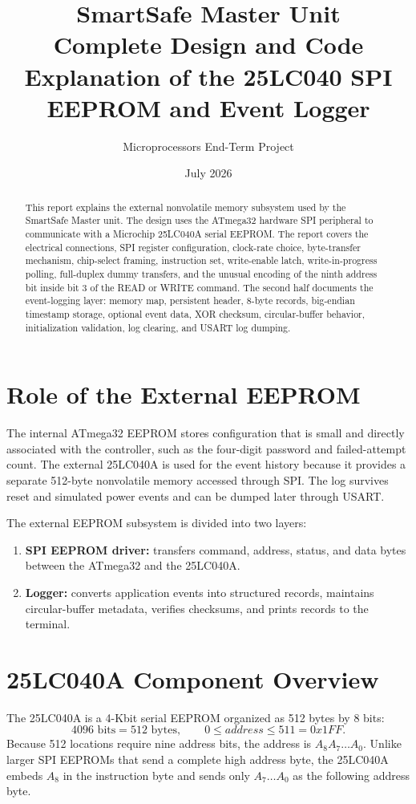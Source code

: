 \documentclass[11pt,a4paper]{article}
\title{\textbf{SmartSafe Master Unit}\\[4pt]
\Large Complete Design and Code Explanation of the 25LC040 SPI EEPROM and Event Logger}
\author{Microprocessors End-Term Project}
\date{July 2026}
\begin{document}
\maketitle
\thispagestyle{empty}

\begin{abstract}
This report explains the external nonvolatile memory subsystem used by the SmartSafe Master unit. The design uses the ATmega32 hardware SPI peripheral to communicate with a Microchip 25LC040A serial EEPROM. The report covers the electrical connections, SPI register configuration, clock-rate choice, byte-transfer mechanism, chip-select framing, instruction set, write-enable latch, write-in-progress polling, full-duplex dummy transfers, and the unusual encoding of the ninth address bit inside bit 3 of the READ or WRITE command. The second half documents the event-logging layer: memory map, persistent header, 8-byte records, big-endian timestamp storage, optional event data, XOR checksum, circular-buffer behavior, initialization validation, log clearing, and USART log dumping.
\end{abstract}

\tableofcontents
\newpage

\section{Role of the External EEPROM}
The internal ATmega32 EEPROM stores configuration that is small and directly associated with the controller, such as the four-digit password and failed-attempt count. The external 25LC040A is used for the event history because it provides a separate 512-byte nonvolatile memory accessed through SPI. The log survives reset and simulated power events and can be dumped later through USART.

The external EEPROM subsystem is divided into two layers:
\begin{enumerate}[label=\arabic*.]
  \item \textbf{SPI EEPROM driver:} transfers command, address, status, and data bytes between the ATmega32 and the 25LC040A.
  \item \textbf{Logger:} converts application events into structured records, maintains circular-buffer metadata, verifies checksums, and prints records to the terminal.
\end{enumerate}

\section{25LC040A Component Overview}
The 25LC040A is a 4-Kbit serial EEPROM organized as 512 bytes by 8 bits:
\[
4096\text{ bits}=512\text{ bytes},\qquad 0\leq address\leq511=0x1FF.
\]
Because 512 locations require nine address bits, the address is $A_8A_7\ldots A_0$. Unlike larger SPI EEPROMs that send a complete high address byte, the 25LC040A embeds $A_8$ in the instruction byte and sends only $A_7\ldots A_0$ as the following address byte.
\end{document}
